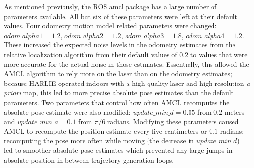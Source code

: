 As mentioned previously, the ROS amcl package has a large number of parameters available. All but six of these parameters were left at their default values. Four odometry motion model related parameters were changed: $odom\_alpha1 = 1.2$, $odom\_alpha2 = 1.2$, $odom\_alpha3 = 1.8$, $odom\_alpha4 = 1.2$. These increased the expected noise levels in the odometry estimates from the relative localization algorithm from their default values of $0.2$ to values that were more accurate for the actual noise in those estimates. Essentially, this allowed the AMCL algorithm to rely more on the laser than on the odometry estimates; because HARLIE operated indoors with a high quality laser and high resolution \emph{a priori} map, this led to more precise absolute pose estimates than the default parameters. Two parameters that control how often AMCL recomputes the absolute pose estimate were also modified: $update\_min\_d = 0.05$ from $0.2$ meters and $update\_min\_a = 0.1$ from $\pi/6 $ radians. Modifying these parameters caused AMCL to recompute the position estimate every five centimeters or $0.1$ radians; recomputing the pose more often while moving (the decrease in $update\_min\_d$) led to smoother absolute pose estimates which prevented any large jumps in absolute position in between trajectory generation loops.

\begin{comment}
This section details the PSO used on HARLIE and has data and figures and shit for how accurate it is

Outline:
	Why do we need localization? Why do we need PRECISE localization?

	Parts
		Relative Localization
			EKF on HARLIE
		Absolute Localization
			AMCL algorithm
			Needs tuned to prevent pops
		Results

\end{comment}
